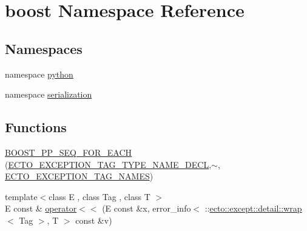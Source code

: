 \hypertarget{namespaceboost}{\section{boost \-Namespace \-Reference}
\label{namespaceboost}
}
\subsection*{\-Namespaces}
\begin{DoxyCompactItemize}
\item 
namespace \hyperlink{namespaceboost_1_1python}{python}
\item 
namespace \hyperlink{namespaceboost_1_1serialization}{serialization}
\end{DoxyCompactItemize}
\subsection*{\-Functions}
\begin{DoxyCompactItemize}
\item 
\hyperlink{namespaceboost_ac098a4e20f2e80e827e2022ad264473a}{\-B\-O\-O\-S\-T\-\_\-\-P\-P\-\_\-\-S\-E\-Q\-\_\-\-F\-O\-R\-\_\-\-E\-A\-C\-H} (\hyperlink{except_8hpp_a61f61285d4749b701b559d10678908a4}{\-E\-C\-T\-O\-\_\-\-E\-X\-C\-E\-P\-T\-I\-O\-N\-\_\-\-T\-A\-G\-\_\-\-T\-Y\-P\-E\-\_\-\-N\-A\-M\-E\-\_\-\-D\-E\-C\-L},$\sim$, \hyperlink{except_8hpp_a6a632b3827deba566cbca48b37bf53e2}{\-E\-C\-T\-O\-\_\-\-E\-X\-C\-E\-P\-T\-I\-O\-N\-\_\-\-T\-A\-G\-\_\-\-N\-A\-M\-E\-S})
\item 
{\footnotesize template$<$class E , class Tag , class T $>$ }\\\-E const \& \hyperlink{namespaceboost_a50253cbebddb80700be930287ab2fcde}{operator$<$$<$} (\-E const \&x, error\-\_\-info$<$ \-::\hyperlink{structecto_1_1except_1_1detail_1_1wrap}{ecto\-::except\-::detail\-::wrap}$<$ \-Tag $>$, \-T $>$ const \&v)
\end{DoxyCompactItemize}


